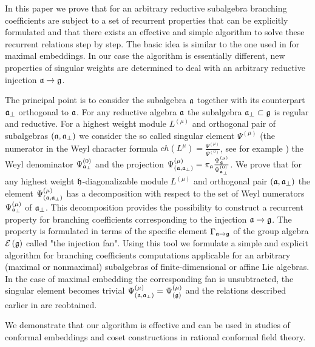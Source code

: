 In this paper we prove that
for an arbitrary reductive subalgebra branching coefficients are subject to
a set of recurrent properties that can be explicitly formulated and that there exists
an effective and simple algorithm to solve these recurrent relations step by step.
The basic idea is similar to the one used in \cite{ilyin812pbc} for maximal embeddings.
In our case the algorithm is essentially different, new properties of singular weights
are determined to deal with an arbitrary reductive injection $\frak{a} \rightarrow \frak{g}$.

The principal point is to consider the subalgebra $\mathfrak{a}$ together with its
counterpart $\mathfrak{a}_{\bot}$ orthogonal to $\mathfrak{a}$.
For any reductive algebra $\mathfrak{a}$ the subalgebra $\mathfrak{a}_{\bot} \subset \frak{g} $ is regular and reductive.
For a highest weight module $L^{\left( \mu \right)}$ and orthogonal pair of subalgebras
$\left(  \mathfrak{a}, \mathfrak{a}_{\bot} \right)$ we consider
the so called singular element $\Psi^{\left( \mu \right)}$ (the numerator
in the Weyl character formula
$ch\left( L^{\mu }\right) =\frac{\Psi ^{\left( \mu \right) }}{\Psi ^{\left( 0\right) }}$,
see for example \cite{humphreys1997introduction})
the Weyl denominator $\Psi ^{\left( 0\right) }_{\mathfrak{a}_{\bot}}$ and the projection
$\Psi ^{\left( \mu \right) }_{\left(  \mathfrak{a}, \mathfrak{a}_{\bot} \right)}
=\pi_{\mathfrak{a}}\frac{\Psi ^{\left( \mu \right) }_{\frak{g}}}{\Psi ^{\left( 0\right) }_{\mathfrak{a}_{\bot}}}$.
We prove that for any highest weight $\mathfrak{h}$-diagonalizable module $L^{\left( \mu \right)}$ and orthogonal pair
$\left(  \mathfrak{a}, \mathfrak{a}_{\bot} \right)$ the element
$\Psi ^{\left( \mu \right) }_{\left(  \mathfrak{a}, \mathfrak{a}_{\bot} \right)}$ has a decomposition with respect to
the set of Weyl numerators $\Psi ^{\left( \mu \right) }_{ \mathfrak{a}_{\bot} }$ of $\mathfrak{a}_{\bot}$.
This decomposition provides the possibility to construct a recurrent property for branching coefficients corresponding
to the injection $\frak{a} \rightarrow \frak{g} $.
The property is formulated in
terms of the specific element $\Gamma_{\mathfrak{a} \rightarrow \mathfrak{g}}$ of the group algebra
$\mathcal{E}\left( \frak{g} \right)$ called "the injection fan".
Using this tool we formulate a simple and
explicit algorithm for branching coefficients computations applicable for an arbitrary (maximal or nonmaximal)
subalgebras of finite-dimensional or affine Lie algebras.
In the case of maximal embedding the corresponding fan is unsubtracted, the singular element
becomes trivial
$\Psi ^{\left( \mu \right) }_{\left(  \mathfrak{a}, \mathfrak{a}_{\bot} \right)}=\Psi ^{\left( \mu \right) }_{\left(  \mathfrak{g}\right)}$
and the relations described earlier in \cite{ilyin812pbc} are reobtained.

We demonstrate that our algorithm is effective and can be used in studies
of conformal embeddings and coset constructions in rational conformal field theory.


